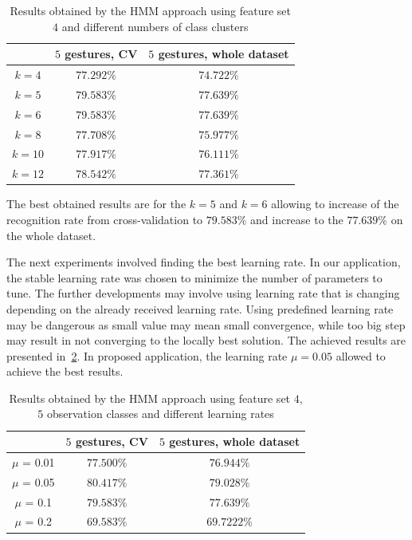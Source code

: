 \begin{table}[htp!]
	\label{tab:dyn1}
	\caption{Results obtained by the HMM approach using feature set $4$ and different numbers of class clusters}
    \begin{tabular}{|c|c|c|}
    \hline
    ~                                 & $5$ gestures, CV & $5$ gestures, whole dataset  \\ \hline
	$k = 4$                  	  & $77.292\%$ & $74.722\%$   \\ \hline
    $k = 5$               	  & $79.583\%$ & $77.639\%$   \\ \hline
    $k = 6$                    & $79.583\%$ & $77.639\%$   \\ \hline
    $k = 8$                     & $77.708\%$ & $75.977\%$   \\ \hline
    $k = 10$                    & $77.917\%$ & $76.111\%$   \\ \hline
    $k = 12$                    & $78.542\%$ & $77.361\%$   \\ \hline
    \end{tabular}
\end{table}
The best obtained results are for the $k=5$ and $k=6$ allowing to increase of the recognition rate from cross-validation to $79.583\%$ and increase to the $77.639\%$ on the whole dataset. 

The next experiments involved finding the best learning rate. 
In our application, the stable learning rate was chosen to minimize the number of parameters to tune. 
The further developments may involve using learning rate that is changing depending on the already received learning rate.
Using predefined learning rate may be dangerous as small value may mean small convergence, while too big step may result in not converging to the locally best solution. 
The achieved results are presented in~\ref{tab:dyn2}.
In proposed application, the learning rate $\mu = 0.05$ allowed to achieve the best results. 

\begin{table}[htp!]
	\label{tab:dyn2}
	\caption{Results obtained by the HMM approach using feature set $4$, $5$ observation classes and different learning rates}
    \begin{tabular}{|c|c|c|}
    \hline
    ~                                 & $5$ gestures, CV & $5$ gestures, whole dataset  \\ \hline
	$\mu$ = 0.01                  	  & $77.500\%$ & $76.944\%$   \\ \hline
    $\mu$ = 0.05                      & $80.417\%$ & $79.028\%$   \\ \hline
    $\mu$ = 0.1                      & $79.583\%$ & $77.639\%$   \\ \hline
    $\mu$ = 0.2                      & $69.583\%$ & $69.7222\%$   \\ \hline
    \end{tabular}
\end{table}


